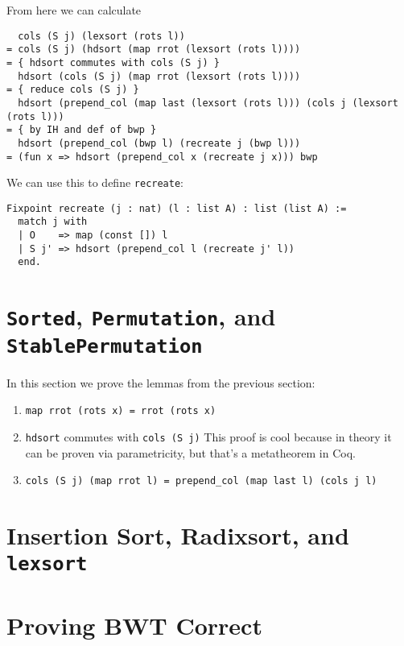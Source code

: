 \documentclass[11pt]{thesis}
\begin{document}
From here we can calculate
\begin{verbatim}
  cols (S j) (lexsort (rots l))
= cols (S j) (hdsort (map rrot (lexsort (rots l))))
= { hdsort commutes with cols (S j) }
  hdsort (cols (S j) (map rrot (lexsort (rots l))))
= { reduce cols (S j) }
  hdsort (prepend_col (map last (lexsort (rots l))) (cols j (lexsort (rots l)))
= { by IH and def of bwp }
  hdsort (prepend_col (bwp l) (recreate j (bwp l)))
= (fun x => hdsort (prepend_col x (recreate j x))) bwp
\end{verbatim}

We can use this to define \verb|recreate|:
\begin{verbatim}
Fixpoint recreate (j : nat) (l : list A) : list (list A) :=
  match j with
  | O    => map (const []) l
  | S j' => hdsort (prepend_col l (recreate j' l))
  end.
\end{verbatim}

\section{\texttt{Sorted}, \texttt{Permutation}, and \texttt{StablePermutation}}
\label{sec:sorted_perm_stable}

In this section we prove the lemmas from the previous section:
\begin{enumerate}
\item
\begin{verbatim}
map rrot (rots x) = rrot (rots x)
\end{verbatim}

\item \verb|hdsort| commutes with \verb|cols (S j)|
  This proof is cool because in theory it can be proven via
  parametricity, but that's a metatheorem in Coq.

\item
\begin{verbatim}
cols (S j) (map rrot l) = prepend_col (map last l) (cols j l)
\end{verbatim}
\end{enumerate}

\section{Insertion Sort, Radixsort, and \texttt{lexsort}}
\label{sec:sort}

\section{Proving BWT Correct}
\label{sec:BWT_proof}

\printbibliography{}
\end{document}
